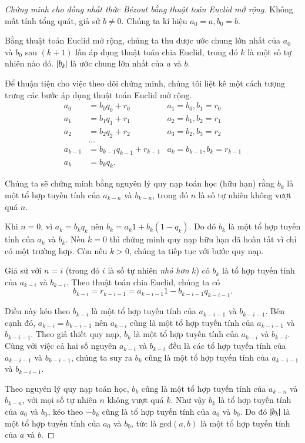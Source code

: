 \begin{proof}[Chứng minh cho đồng nhất thức B\'{e}zout bằng thuật toán Euclid mở rộng]
	Không mất tính tổng quát, giả sử $b\ne 0$. Chúng ta kí hiệu $a_{0} = a, b_{0} = b$.

	Bằng thuật toán Euclid mở rộng, chúng ta thu được ước chung lớn nhất của $a_{0}$ và $b_{0}$ sau $(k+1)$ lần áp dụng thuật toán chia Euclid, trong đó $k$ là một số tự nhiên nào đó. $\left\vert{b_{k}}\right\vert$ là ước chung lớn nhất của $a$ và $b$.

	Để thuận tiện cho việc theo dõi chứng minh, chúng tôi liệt kê một cách tượng trưng các bước áp dụng thuật toán Euclid mở rộng.
	\begin{align*}
		a_{0}   & = b_{0} q_{0} + r_{0}       & a_{1} = b_{0}, b_{1} = r_{0}     \\
		a_{1}   & = b_{1} q_{1} + r_{1}       & a_{2} = b_{1}, b_{2} = r_{1}     \\
		a_{2}   & = b_{2} q_{2} + r_{2}       & a_{3} = b_{2}, b_{3} = r_{2}     \\
		        & \ldots                                                         \\
		a_{k-1} & = b_{k-1} q_{k-1} + r_{k-1} & a_{k} = b_{k-1}, b_{k} = r_{k-1} \\
		a_{k}   & = b_{k} q_{k}.
	\end{align*}

	Chúng ta sẽ chứng minh bằng nguyên lý quy nạp toán học (hữu hạn) rằng $b_{k}$ là một tổ hợp tuyến tính của $a_{k-n}$ và $b_{k-n}$, trong đó $n$ là số tự nhiên không vượt quá $n$.

	Khi $n = 0$, vì $a_{k} = b_{k} q_{k}$ nên $b_{k} = a_{k} 1 + b_{k} (1 - q_{k})$.  Do đó $b_{k}$ là một tổ hợp tuyến tính của $a_{k}$ và $b_{k}$. Nếu $k = 0$ thì chứng minh quy nạp hữu hạn đã hoàn tất vì chỉ có một trường hợp. Còn nếu $k > 0$, chúng ta tiếp tục với bước quy nạp.

	Giả sử với $n = i$ (trong đó $i$ là số tự nhiên \textit{nhỏ hơn} $k$) có $b_{k}$ là tổ hợp tuyến tính của $a_{k-i}$ và $b_{k-i}$. Theo thuật toán chia Euclid, chúng ta có
	\[
		b_{k-i} = r_{k-i-1} = a_{k-i-1} 1 - b_{k-i-1} q_{k-i-1}.
	\]

	Điều này kéo theo $b_{k-i}$ là một tổ hợp tuyến tính của $a_{k-i-1}$ và $b_{k-i-1}$. Bên cạnh đó, $a_{k-i} = b_{k-i-1}$ nên $a_{k-i}$ cũng là một tổ hợp tuyến tính của $a_{k-i-1}$ và $b_{k-i-1}$. Theo giả thiết quy nạp, $b_{k}$ là một tổ hợp tuyến tính của $a_{k-i}$ và $b_{k-i}$. Cùng với việc cả hai số nguyên $a_{k-i}$ và $b_{k-i}$ đều là các tổ hợp tuyến tính của $a_{k-i-1}$ và $b_{k-i-1}$, chúng ta suy ra $b_{k}$ cũng là một tổ hợp tuyến tính của $a_{k-i-1}$ và $b_{k-i-1}$.

	Theo nguyên lý quy nạp toán học, $b_{k}$ cũng là một tổ hợp tuyến tính của $a_{k-n}$ và $b_{k-n}$, với mọi số tự nhiên $n$ không vượt quá $k$. Như vậy $b_{k}$ là tổ hợp tuyến tính của $a_{0}$ và $b_{0}$, kéo theo $-b_{k}$ cũng là tổ hợp tuyến tính của $a_{0}$ và $b_{0}$. Do đó $\left\vert{b_{k}}\right\vert$ là một tổ hợp tuyến tính của $a_{0}$ và $b_{0}$, tức là $\text{gcd}(a, b)$ là một tổ hợp tuyến tính của $a$ và $b$.
\end{proof}

